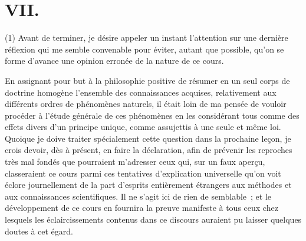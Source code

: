 \documentclass[french,twoside]{book} %
\begin{document}
\section[{VII.}]{VII.}
\noindent (1) Avant de terminer, je désire appeler un instant l’attention sur une dernière réflexion qui me semble convenable pour éviter, autant que possible, qu’on se forme d’avance une opinion erronée de la nature de ce cours.\par
En assignant pour but à la philosophie positive de résumer en un seul corps de doctrine homogène l’ensemble des connaissances acquises, relativement aux différents ordres de phénomènes naturels, il était loin de ma pensée de vouloir procéder à l’étude générale de ces phénomènes en les considérant tous comme des effets divers d’un principe unique, comme assujettis à une seule et même loi. Quoique je doive traiter spécialement cette question dans la prochaine leçon, je crois devoir, dès à présent, en faire la déclaration, afin de prévenir les reproches très mal fondés que pourraient m’adresser ceux qui, sur un faux aperçu, classeraient ce cours parmi ces tentatives d’explication universelle qu’on voit éclore journellement de la part d’esprits entièrement étrangers aux méthodes et aux connaissances scientifiques. Il ne s’agit ici de rien de semblable ; et le développement de ce cours en fournira la preuve manifeste à tous ceux chez lesquels les éclaircissements contenus dans ce discours auraient pu laisser quelques doutes à cet égard.\par
\end{document}
